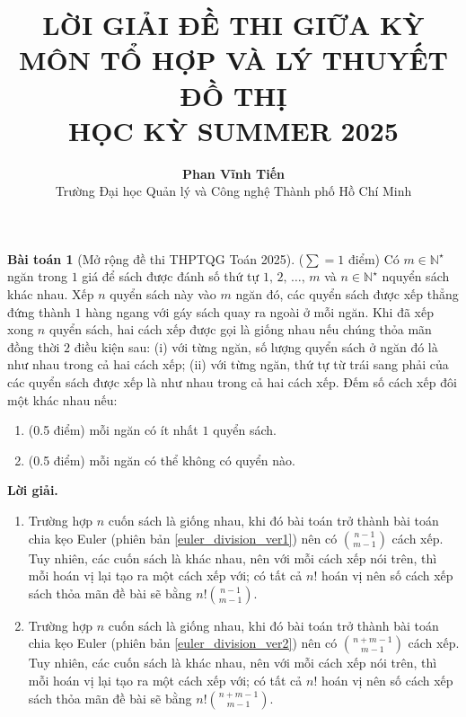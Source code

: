 \documentclass[a4paper, 11pt]{article}
\title{\Large \textbf{LỜI GIẢI ĐỀ THI GIỮA KỲ MÔN TỔ HỢP VÀ LÝ THUYẾT ĐỒ THỊ} \\ HỌC KỲ SUMMER 2025}
\author{\normalsize\textbf{Phan Vĩnh Tiến} \\ \normalsize Trường Đại học Quản lý và Công nghệ Thành phố Hồ Chí Minh}
\date{}
\theoremstyle{definition}
\newtheorem{baitoan}{Bài toán}
\begin{document}
	\maketitle 
	


	\begin{tcolorbox}[breakable]
    	\begin{baitoan}[Mở rộng đề thi THPTQG Toán 2025]
			($\sum = 1$ điểm) Có $m\in \mathbb{N^\star}$ ngăn trong $1$ giá để sách được đánh số thứ tự $1,\,2,\,\ldots,\,m$ và $n\in \mathbb{N^\star}$ nquyển sách khác nhau. Xếp $n$ quyển sách này vào $m$ ngăn đó, các quyển sách được xếp thẳng đứng thành $1$ hàng ngang với gáy sách quay ra ngoài ở mỗi ngăn. Khi đã xếp xong $n$ quyển sách, hai cách xếp được gọi là giống nhau nếu chúng thỏa mãn đồng thời $2$ điều kiện sau: (i) với từng ngăn, số lượng quyển sách ở ngăn đó là như nhau trong cả hai cách xếp; (ii) với từng ngăn, thứ tự từ trái sang phải của các quyển sách được xếp là như nhau trong cả hai cách xếp. Đếm số cách xếp đôi một khác nhau nếu: \begin{enumerate}[label=(\alph*)]
				\item (0.5 điểm) mỗi ngăn có ít nhất $1$ quyển sách.
				\item (0.5 điểm) mỗi ngăn có thể không có quyển nào.
			\end{enumerate}
		\end{baitoan}
	\end{tcolorbox}

	\textbf{Lời giải. }
	\begin{enumerate}[label=(\alph*)]
		\item Trường hợp $n$ cuốn sách là giống nhau, khi đó bài toán trở thành bài toán chia kẹo Euler (phiên bản \ref{euler_division_ver1}) nên có $\displaystyle {n-1 \choose m-1}$ cách xếp. Tuy nhiên, các cuốn sách là khác nhau, nên với mỗi cách xếp nói trên, thì mỗi hoán vị lại tạo ra một cách xếp với; có tất cả $n!$ hoán vị nên số cách xếp sách thỏa mãn đề bài sẽ bằng $n!\displaystyle {n-1 \choose m-1}$.
		\item Trường hợp $n$ cuốn sách là giống nhau, khi đó bài toán trở thành bài toán chia kẹo Euler (phiên bản \ref{euler_division_ver2}) nên có $\displaystyle {n+m-1 \choose m-1}$ cách xếp. Tuy nhiên, các cuốn sách là khác nhau, nên với mỗi cách xếp nói trên, thì mỗi hoán vị lại tạo ra một cách xếp với; có tất cả $n!$ hoán vị nên số cách xếp sách thỏa mãn đề bài sẽ bằng $n!\displaystyle {n+m-1 \choose m-1}$.
	\end{enumerate}
\end{document}
